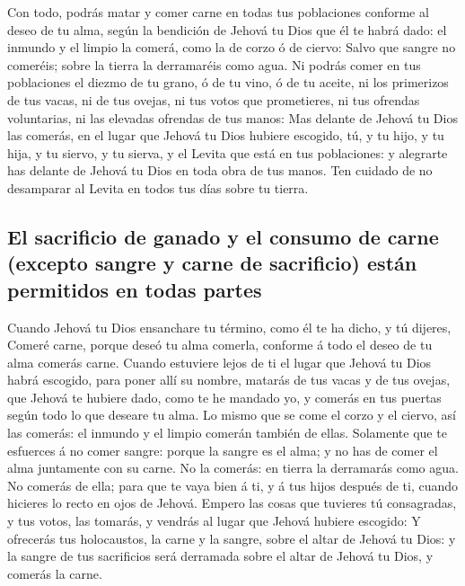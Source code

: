  Con todo, podrás matar y comer carne en todas tus
poblaciones conforme al deseo de tu alma, según la bendición de Jehová
tu Dios que él te habrá dado: el inmundo y el limpio la comerá, como la
de corzo ó de ciervo:  Salvo que sangre no comeréis;
sobre la tierra la derramaréis como agua.  Ni podrás
comer en tus poblaciones el diezmo de tu grano, ó de tu vino, ó de tu
aceite, ni los primerizos de tus vacas, ni de tus ovejas, ni tus votos
que prometieres, ni tus ofrendas voluntarias, ni las elevadas ofrendas
de tus manos:  Mas delante de Jehová tu Dios las comerás,
en el lugar que Jehová tu Dios hubiere escogido, tú, y tu hijo, y tu
hija, y tu siervo, y tu sierva, y el Levita que está en tus poblaciones:
y alegrarte has delante de Jehová tu Dios en toda obra de tus manos.
 Ten cuidado de no desamparar al Levita en todos tus días
sobre tu tierra.

\hypertarget{el-sacrificio-de-ganado-y-el-consumo-de-carne-excepto-sangre-y-carne-de-sacrificio-estuxe1n-permitidos-en-todas-partes}{%
\subsection{El sacrificio de ganado y el consumo de carne (excepto
sangre y carne de sacrificio) están permitidos en todas
partes}\label{el-sacrificio-de-ganado-y-el-consumo-de-carne-excepto-sangre-y-carne-de-sacrificio-estuxe1n-permitidos-en-todas-partes}}

 Cuando Jehová tu Dios ensanchare tu término, como él te
ha dicho, y tú dijeres, Comeré carne, porque deseó tu alma comerla,
conforme á todo el deseo de tu alma comerás carne. 
Cuando estuviere lejos de ti el lugar que Jehová tu Dios habrá escogido,
para poner allí su nombre, matarás de tus vacas y de tus ovejas, que
Jehová te hubiere dado, como te he mandado yo, y comerás en tus puertas
según todo lo que deseare tu alma.  Lo mismo que se come
el corzo y el ciervo, así las comerás: el inmundo y el limpio comerán
también de ellas.  Solamente que te esfuerces á no comer
sangre: porque la sangre es el alma; y no has de comer el alma
juntamente con su carne.  No la comerás: en tierra la
derramarás como agua.  No comerás de ella; para que te
vaya bien á ti, y á tus hijos después de ti, cuando hicieres lo recto en
ojos de Jehová.  Empero las cosas que tuvieres tú
consagradas, y tus votos, las tomarás, y vendrás al lugar que Jehová
hubiere escogido:  Y ofrecerás tus holocaustos, la carne
y la sangre, sobre el altar de Jehová tu Dios: y la sangre de tus
sacrificios será derramada sobre el altar de Jehová tu Dios, y comerás
la carne.

